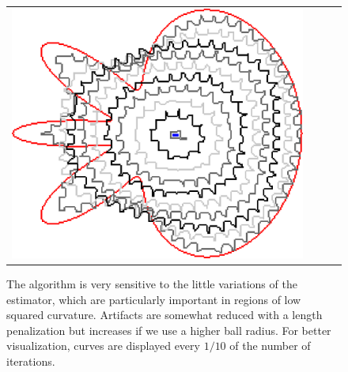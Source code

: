 \begin{figure}
\begin{tabular}{p{2.5em}ccc}
\includegraphics[scale=0.24]{figures/chapter6/radius-effect/flower/improve/len_pen0.5/radius-9/summary.pdf}
\end{tabular}

\caption{The algorithm is very sensitive to the little variations of the estimator, which are particularly important in regions of low squared curvature. Artifacts are somewhat reduced with a length penalization but increases if we use a higher ball radius. For better visualization, curves are displayed every $1/10$ of the number of iterations. }
\label{fig:m1-square-flow}
\end{figure}


